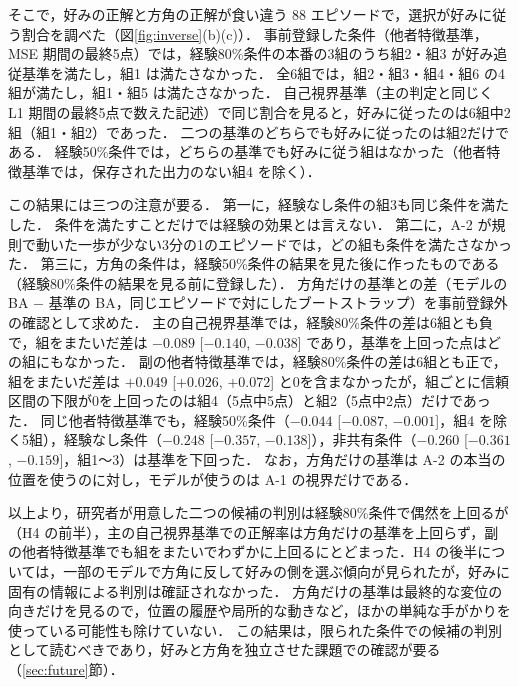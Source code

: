 そこで，好みの正解と方角の正解が食い違う 88 エピソードで，選択が好みに従う割合を調べた（図\ref{fig:inverse}(b)(c)）．
事前登録した条件（他者特徴基準，MSE 期間の最終5点）では，経験80\%条件の本番の3組のうち組2・組3 が好み追従基準を満たし，組1 は満たさなかった．
全6組では，組2・組3・組4・組6 の4組が満たし，組1・組5 は満たさなかった．
自己視界基準（主の判定と同じく L1 期間の最終5点で数えた記述）で同じ割合を見ると，好みに従ったのは6組中2組（組1・組2）であった．
二つの基準のどちらでも好みに従ったのは組2だけである．
経験50\%条件では，どちらの基準でも好みに従う組はなかった（他者特徴基準では，保存された出力のない組4 を除く）．

この結果には三つの注意が要る．
第一に，経験なし条件の組3も同じ条件を満たした．
条件を満たすことだけでは経験の効果とは言えない．
第二に，A-2 が規則で動いた一歩が少ない3分の1のエピソードでは，どの組も条件を満たさなかった．
第三に，方角の条件は，経験50\%条件の結果を見た後に作ったものである（経験80\%条件の結果を見る前に登録した）．
方角だけの基準との差（モデルの BA $-$ 基準の BA，同じエピソードで対にしたブートストラップ）を事前登録外の確認として求めた．
主の自己視界基準では，経験80\%条件の差は6組とも負で，組をまたいだ差は $-0.089$ [$-0.140$, $-0.038$] であり，基準を上回った点はどの組にもなかった．
副の他者特徴基準では，経験80\%条件の差は6組とも正で，組をまたいだ差は $+0.049$ [$+0.026$, $+0.072$] と0を含まなかったが，組ごとに信頼区間の下限が0を上回ったのは組4（5点中5点）と組2（5点中2点）だけであった．
同じ他者特徴基準でも，経験50\%条件（$-0.044$ [$-0.087$, $-0.001$]，組4 を除く5組），経験なし条件（$-0.248$ [$-0.357$, $-0.138$]），非共有条件（$-0.260$ [$-0.361$, $-0.159$]，組1〜3）は基準を下回った．
なお，方角だけの基準は A-2 の本当の位置を使うのに対し，モデルが使うのは A-1 の視界だけである．

以上より，研究者が用意した二つの候補の判別は経験80\%条件で偶然を上回るが（H4 の前半），主の自己視界基準での正解率は方角だけの基準を上回らず，副の他者特徴基準でも組をまたいでわずかに上回るにとどまった．H4 の後半については，一部のモデルで方角に反して好みの側を選ぶ傾向が見られたが，好みに固有の情報による判別は確証されなかった．
方角だけの基準は最終的な変位の向きだけを見るので，位置の履歴や局所的な動きなど，ほかの単純な手がかりを使っている可能性も除けていない．
この結果は，限られた条件での候補の判別として読むべきであり，好みと方角を独立させた課題での確認が要る（\ref{sec:future}節）．

